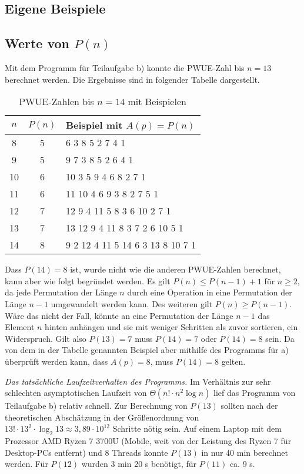 \documentclass[a4paper, 11pt, ngerman]{article}
\begin{document}
\subsection{Eigene Beispiele}

\subsection{Werte von $P(n)$}

Mit dem Programm für Teilaufgabe b) konnte die PWUE-Zahl bis $n = 13$ berechnet werden. Die Ergebnisse sind in folgender Tabelle dargestellt.

\begin{table}[H]
    \centering
    \begin{tabular}{c c l}
        $n$ & $P(n)$ & Beispiel mit $A(p) = P(n)$       \\
        \hline
        8   & 5      & 6 3 8 5 2 7 4 1                  \\
        9   & 5      & 9 7 3 8 5 2 6 4 1                \\
        10  & 6      & 10 3 5 9 4 6 8 2 7 1             \\
        11  & 6      & 11 10 4 6 9 3 8 2 7 5 1          \\
        12  & 7      & 12 9 4 11 5 8 3 6 10 2 7 1       \\
        13  & 7      & 13 12 9 4 11 8 3 7 2 6 10 5 1    \\
        14  & 8      & 9 2 12 4 11 5 14 6 3 13 8 10 7 1 \\
    \end{tabular}
    \caption{PWUE-Zahlen bis $n = 14$ mit Beispielen}
\end{table}

\noindent Dass $P(14) = 8$ ist, wurde nicht wie die anderen PWUE-Zahlen berechnet, kann aber wie folgt begründet werden. Es gilt $P(n) \le P(n - 1) + 1$ für $n \ge 2$, da jede Permutation der Länge $n$ durch eine Operation in eine Permutation der Länge $n - 1$ umgewandelt werden kann. Des weiteren gilt $P(n) \ge P(n - 1)$. Wäre das nicht der Fall, könnte an eine Permutation der Länge $n - 1$ das Element $n$ hinten anhängen und sie mit weniger Schritten als zuvor sortieren, ein Widerspruch. Gilt also $P(13) = 7$ muss $P(14) = 7$ oder $P(14) = 8$ sein. Da von dem in der Tabelle genannten Beispiel aber mithilfe des Programms für a) überprüft werden kann, dass $A(p) = 8$, muss $P(14) = 8$ gelten.
\bigskip

\noindent \emph{Das tatsächliche Laufzeitverhalten des Programms.} Im Verhältnis zur sehr schlechten asymptotischen Laufzeit von $\Theta(n! \cdot n^2 \log n)$ lief das Programm von Teilaufgabe b) relativ schnell. Zur Berechnung von $P(13)$ sollten nach der theoretischen Abschätzung in der Größenordnung von $13! \cdot 13^2 \cdot \log_2 13 \approx 3,89 \cdot 10^{12}$ Schritte nötig sein. Auf einem Laptop mit dem Prozessor AMD Ryzen 7 3700U (Mobile, weit von der Leistung des Ryzen 7 für Desktop-PCs entfernt) und 8 Threads konnte $P(13)$ in nur 40 min berechnet werden. Für $P(12)$ wurden 3 min 20 s benötigt, für $P(11)$ ca. 9 s.
\end{document}
